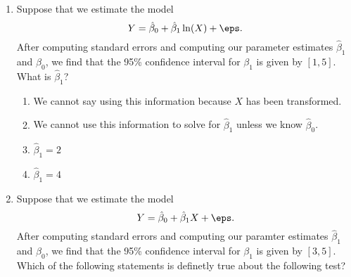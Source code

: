 \documentclass[10pt]{article}
\begin{document}
\begin{enumerate}
	 
	\item Suppose that we estimate the model 
	\[ Y = \hat\beta_0 + \hat\beta_1\ln(X) + \eps .\]
	After computing standard errors and computing our parameter estimates \(\hat\beta_1\) and  \(\hat\beta_0\), we find that the 95\% confidence interval for \(\beta_1\) is given by  \([1,5]\). What is \(\hat\beta_1\)?
	 \begin{enumerate}
		\item We cannot say using this information because \(X\) has been transformed.
		\item We cannot use this information to solve for \(\hat\beta_1\) unless we know  \(\hat\beta_0\).
		\item \(\hat\beta_1 = 2\)
		\item \(\hat\beta_1 = 4\)
	\end{enumerate}
	 
	\item Suppose that we estimate the model \[ Y = \hat\beta_0 + \hat\beta_1 X + \eps.\] After computing standard errors and computing our paramter estimates \(\hat\beta_1\) and  \(\hat\beta_0\), we find that the 95\% confidence interval for \(\beta_1\) is given by  \([3,5]\). Which of the following statements is definetly true about the following test?

\end{enumerate}
\end{document}
